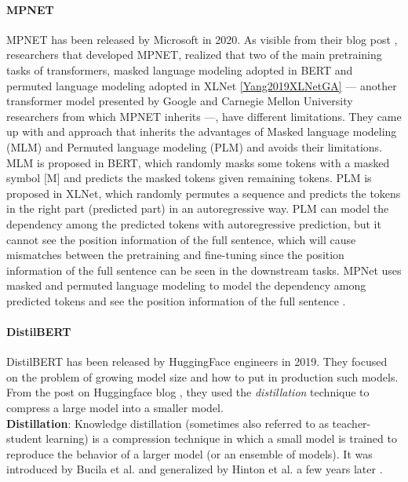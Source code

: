 \documentclass[\main/main.tex]{subfiles}
\begin{document}
\paragraph{MPNET}
MPNET has been released by Microsoft in 2020. As visible from their blog post \cite{mpnet_blog_post},  researchers that developed MPNET, realized that two of the main pretraining tasks of transformers, masked language modeling adopted in BERT and permuted language modeling adopted in XLNet \ref{Yang2019XLNetGA} --- another transformer model presented by Google and Carnegie Mellon University researchers from which MPNET inherits ---, have different limitations. They came up with and approach that inherits the advantages of Masked language modeling (MLM) and Permuted language modeling (PLM) and avoids their limitations. MLM is proposed in BERT, which randomly masks some tokens with a masked symbol [M] and predicts the masked tokens given remaining tokens. PLM is proposed in XLNet, which randomly permutes a sequence and predicts the tokens in the right part (predicted part) in an autoregressive way. PLM can model the dependency among the predicted tokens with autoregressive prediction, but it cannot see the position information of the full sentence, which will cause mismatches between the pretraining and fine-tuning since the position information of the full sentence can be seen in the downstream tasks. MPNet uses masked and permuted language modeling to model the dependency among predicted tokens and see the position information of the full sentence \cite{DBLP:journals/corr/abs-2004-09297}.
\paragraph{DistilBERT}
DistilBERT has been released by HuggingFace engineers in 2019. They focused on the problem of growing model size and how to put in production such models. From the post on Huggingface blog \cite{distilbert_blog_post}, they used the \emph{distillation} technique to compress a large model into a smaller model.\\
\textbf{Distillation}: Knowledge distillation (sometimes also referred to as teacher-student learning) is a compression technique in which a small model is trained to reproduce the behavior of a larger model (or an ensemble of models). It was introduced by Bucila et al. \cite{10.1145/1150402.1150464} and generalized by Hinton et al. \cite{hinton2015distilling} a few years later \cite{DBLP:journals/corr/abs-1910-01108}.
\end{document}
